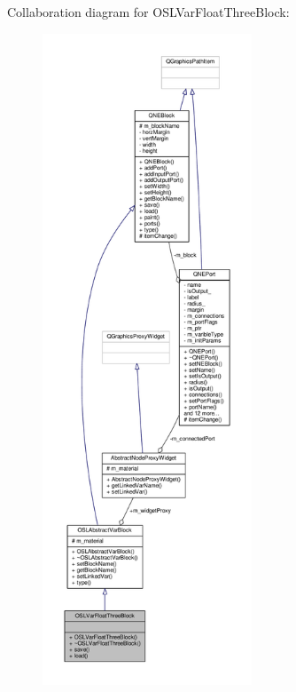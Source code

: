 Collaboration diagram for O\-S\-L\-Var\-Float\-Three\-Block\-:
\nopagebreak
\begin{figure}[H]
\begin{center}
\leavevmode
\includegraphics[height=550pt]{class_o_s_l_var_float_three_block__coll__graph}
\end{center}
\end{figure}
